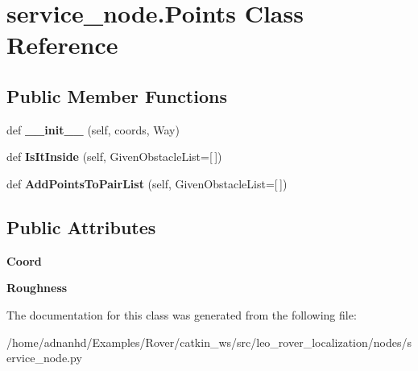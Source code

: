 \hypertarget{classservice__node_1_1Points}{}\section{service\+\_\+node.\+Points Class Reference}
\label{classservice__node_1_1Points}
\subsection*{Public Member Functions}
\begin{DoxyCompactItemize}
\item 
\mbox{\label{classservice__node_1_1Points_a4b61c9c2f75645cdb97d02a47485848f}} 
def {\bfseries \+\_\+\+\_\+init\+\_\+\+\_\+} (self, coords, Way)
\item 
\mbox{\label{classservice__node_1_1Points_af36e30c73ec133c560d11ae983338dbe}} 
def {\bfseries Is\+It\+Inside} (self, Given\+Obstacle\+List=\mbox{[}$\,$\mbox{]})
\item 
\mbox{\label{classservice__node_1_1Points_a8522e492d24585f354b324b0af5281c5}} 
def {\bfseries Add\+Points\+To\+Pair\+List} (self, Given\+Obstacle\+List=\mbox{[}$\,$\mbox{]})
\end{DoxyCompactItemize}
\subsection*{Public Attributes}
\begin{DoxyCompactItemize}
\item 
\mbox{\label{classservice__node_1_1Points_a5ad9393800d33cfdb3b1be4b94818a9d}} 
{\bfseries Coord}
\item 
\mbox{\label{classservice__node_1_1Points_a9b66d38fcaa6f50c86c72aa290cb731b}} 
{\bfseries Roughness}
\end{DoxyCompactItemize}


The documentation for this class was generated from the following file\+:\begin{DoxyCompactItemize}
\item 
/home/adnanhd/\+Examples/\+Rover/catkin\+\_\+ws/src/leo\+\_\+rover\+\_\+localization/nodes/service\+\_\+node.\+py\end{DoxyCompactItemize}
